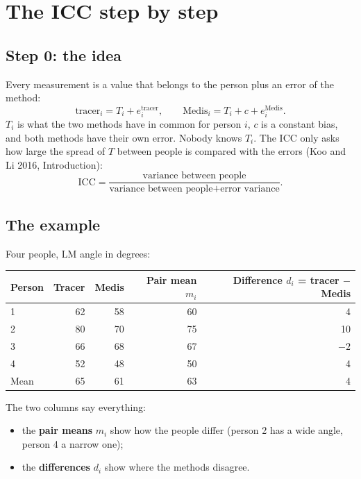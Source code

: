 \documentclass[11pt]{article}
\begin{document}
\section*{The ICC step by step}

\subsection*{Step 0: the idea}

Every measurement is a value that belongs to the person plus an error of the method:
\[
  \text{tracer}_i = T_i + e^{\text{tracer}}_i, \qquad \text{Medis}_i = T_i + c + e^{\text{Medis}}_i .
\]
$T_i$ is what the two methods have in common for person $i$, $c$ is a constant bias, and both methods have their
own error. Nobody knows $T_i$. The ICC only asks how large the spread of $T$ between people is compared with
the errors (Koo and Li 2016, Introduction):
\[
  \text{ICC} = \frac{\text{variance between people}}{\text{variance between people} + \text{error variance}}.
\]

\subsection*{The example}

Four people, LM angle in degrees:

\begin{center}
\begin{tabular}{lrrrr}
  \toprule
  Person & Tracer & Medis & Pair mean $m_i$ & Difference $d_i$ = tracer $-$ Medis \\
  \midrule
  1 & 62 & 58 & 60 & 4 \\
  2 & 80 & 70 & 75 & 10 \\
  3 & 66 & 68 & 67 & $-2$ \\
  4 & 52 & 48 & 50 & 4 \\
  \midrule
  Mean & 65 & 61 & 63 & 4 \\
  \bottomrule
\end{tabular}
\end{center}

The two columns say everything:
\begin{itemize}
  \item the \textbf{pair means} $m_i$ show how the people differ (person 2 has a wide angle, person 4 a narrow one);
  \item the \textbf{differences} $d_i$ show where the methods disagree.
\end{itemize}
\end{document}
